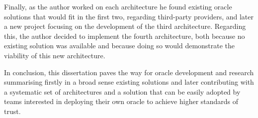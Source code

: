 Finally, as the author worked on each architecture he found existing oracle solutions that would fit in the first two, regarding third-party providers, and later a new project focusing on the development of the third architecture. Regarding this, the author decided to implement the fourth architecture, both because no existing solution was available and because doing so would demonstrate the viability of this new architecture.

In conclusion, this dissertation paves the way for oracle development and research summarising firstly in a broad sense existing solutions and later contributing with a systematic set of architectures and a solution that can be easily adopted by teams interested in deploying their own oracle to achieve higher standards of trust.
